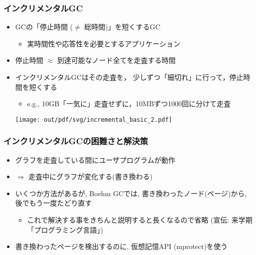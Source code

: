 \documentclass[12pt,dvipdfmx]{beamer}
\begin{document}
\begin{frame}
\frametitle{インクリメンタルGC}
\begin{itemize}
\item GCの「停止時間 ($\neq$ 総時間)」を短くするGC
  \begin{itemize}
  \item 実時間性や応答性を必要とするアプリケーション
  \end{itemize}
\item 停止時間 $\approx$ 到達可能なノード全てを走査する時間
\item インクリメンタルGCはその走査を，
  少しずつ「細切れ」に行って，停止時間を短くする
  \begin{itemize}
  \item e.g., 10GB「一気に」走査せずに，10MBずつ1000回に分けて走査
  \end{itemize}
\begin{center}
\texttt{[image: out/pdf/svg/incremental\_basic\_2.pdf]}
\end{center}
\end{itemize}
\end{frame}

\begin{frame}
\frametitle{インクリメンタルGCの困難さと解決策}
\begin{itemize}
\item グラフを走査している間にユーザプログラムが動作
\item $\Rightarrow$ 走査中にグラフが変化する(書き換わる)
\item<4-> いくつか方法があるが, Boehm GCでは,
  書き換わったノード(ページ)から, 後でもう一度たどり直す
  \begin{itemize}
  \item これで解決する事をきちんと説明すると長くなるので省略 (宣伝: 来学期「プログラミング言語」)
  \end{itemize}
\item<5-> 書き換わったページを検出するのに, 仮想記憶API (mprotect)を使う
\end{itemize}

\begin{center}
%
%
%
\end{center}
\end{frame}
\end{document}
